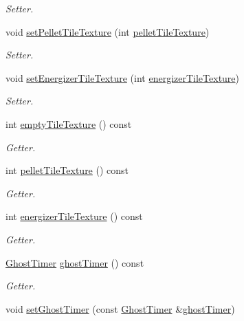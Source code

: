\begin{DoxyCompactItemize}
\begin{DoxyCompactList}\small\item\em Setter. \end{DoxyCompactList}\item 
void \hyperlink{class_editor_level_ad74061a119c6861c01aebb5995cca76b}{set\+Pellet\+Tile\+Texture} (int \hyperlink{class_editor_level_acced1d750cf3645b0f7146f4c8e8c3b8}{pellet\+Tile\+Texture})
\begin{DoxyCompactList}\small\item\em Setter. \end{DoxyCompactList}\item 
void \hyperlink{class_editor_level_ae087a222e9cbd7fc37373b5cc928b150}{set\+Energizer\+Tile\+Texture} (int \hyperlink{class_editor_level_aeb370a3927426307b29765ff53805a66}{energizer\+Tile\+Texture})
\begin{DoxyCompactList}\small\item\em Setter. \end{DoxyCompactList}\item 
int \hyperlink{class_editor_level_a6c85fe38496b6818f46e01769dac0149}{empty\+Tile\+Texture} () const 
\begin{DoxyCompactList}\small\item\em Getter. \end{DoxyCompactList}\item 
int \hyperlink{class_editor_level_acced1d750cf3645b0f7146f4c8e8c3b8}{pellet\+Tile\+Texture} () const 
\begin{DoxyCompactList}\small\item\em Getter. \end{DoxyCompactList}\item 
int \hyperlink{class_editor_level_aeb370a3927426307b29765ff53805a66}{energizer\+Tile\+Texture} () const 
\begin{DoxyCompactList}\small\item\em Getter. \end{DoxyCompactList}\item 
\hyperlink{class_ghost_timer}{Ghost\+Timer} \hyperlink{class_editor_level_a1a4017c0adb3d6075fa0191016d9ed40}{ghost\+Timer} () const 
\begin{DoxyCompactList}\small\item\em Getter. \end{DoxyCompactList}\item 
void \hyperlink{class_editor_level_a81ebd2fb2f1eae67077f9c8b33b7d8d7}{set\+Ghost\+Timer} (const \hyperlink{class_ghost_timer}{Ghost\+Timer} \&\hyperlink{class_editor_level_a1a4017c0adb3d6075fa0191016d9ed40}{ghost\+Timer})

\end{DoxyCompactItemize}
